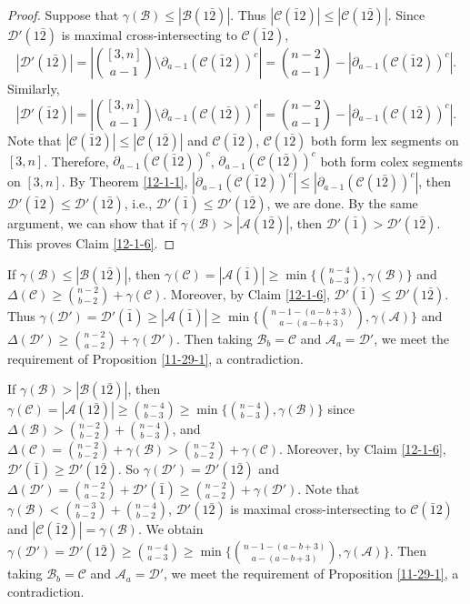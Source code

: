 \documentclass[11pt]{article}
\begin{document}
\begin{proof}
Suppose that $\gamma(\mathcal{B})\le |\mathcal{B}(1\bar{2})|$. Thus $|\mathcal{C}(\bar{1}2)|\le |\mathcal{C}(1\bar{2})|$. Since $\mathcal{D}'(1\bar{2})$ is maximal cross-intersecting to $\mathcal{C}(\bar{1}2)$, 
$$|\mathcal{D}'(1\bar{2})|=|{[3,n]\choose a-1}\setminus \partial_{a-1}(\mathcal{C}(\bar{1}2))^c|={n-2\choose a-1}-|\partial_{a-1}(\mathcal{C}(\bar{1}2))^c|.$$ 
Similarly, 
$$|\mathcal{D}'(\bar{1}2)|=|{[3,n]\choose a-1}\setminus \partial_{a-1}(\mathcal{C}(1\bar{2}))^c|={n-2\choose a-1}-|\partial_{a-1}(\mathcal{C}(1\bar{2}))^c|.$$ 
Note that $|\mathcal{C}(\bar{1}2)|\le |\mathcal{C}(1\bar{2})|$ and $\mathcal{C}(\bar{1}2)$, $\mathcal{C}(1\bar{2})$ both form lex segments on $[3,n]$. Therefore, $\partial_{a-1}(\mathcal{C}(\bar{1}2))^c$, $\partial_{a-1}(\mathcal{C}(1\bar{2}))^c$ both form colex segments on $[3,n]$. By Theorem \ref{12-1-1}, 
$|\partial_{a-1}(\mathcal{C}(\bar{1}2))^c| \le |\partial_{a-1}(\mathcal{C}(1\bar{2}))^c|$, 
 then $\mathcal{D}'(\bar{1}2)\le \mathcal{D}'(1\bar{2})$, i.e., $\mathcal{D}'(\bar{1})\le \mathcal{D}'(1\bar{2})$, we are done. 
By the same argument, we can show that if  $\gamma(\mathcal{B})> |\mathcal{A}(1\bar{2})|$, then $\mathcal{D}'(\bar{1})> \mathcal{D}'(1\bar{2})$. This proves Claim \ref{12-1-6}.
\end{proof}

If $\gamma(\mathcal{B})\le |\mathcal{B}(1\bar{2})|$, then 
 $\gamma(\mathcal{C})=|\mathcal{A}(\bar{1})|\ge \min \{{n-4\choose b-3}, \gamma(\mathcal{B})\}$ and $\Delta(\mathcal{C})\ge {n-2\choose b-2}+\gamma(\mathcal{C})$.  Moreover,  by Claim \ref{12-1-6}, 
$\mathcal{D}'(\bar{1})\le \mathcal{D}'(1\bar{2})$.  Thus 
$\gamma(\mathcal{D}')=\mathcal{D}'(\bar{1})\ge |\mathcal{A}(\bar{1})|\ge \min \{ {n-1-(a-b+3)\choose a-(a-b+3)}, \gamma(\mathcal{A})   \}$ and $\Delta(\mathcal{D}')\ge {n-2\choose a-2}+\gamma(\mathcal{D}')$. Then taking $\mathcal{B}_b=\mathcal{C}$ and $\mathcal{A}_a=\mathcal{D}'$, we meet the requirement of Proposition \ref{11-29-1}, a contradiction.


If $\gamma(\mathcal{B})> |\mathcal{B}(1\bar{2})|$, then 
 $\gamma(\mathcal{C})=|\mathcal{A}(1\bar{2})|\ge {n-4\choose b-3} \ge \min \{{n-4\choose b-3}, \gamma(\mathcal{B})\}$ since $\Delta(\mathcal{B})> {n-2\choose b-2}+{n-4\choose b-3}$,  and $\Delta(\mathcal{C})={n-2\choose b-2}+\gamma(\mathcal{B})> {n-2\choose b-2}+\gamma(\mathcal{C})$.  Moreover,  by Claim \ref{12-1-6}, 
$\mathcal{D}'(\bar{1})\ge  \mathcal{D}'(1\bar{2})$. 
So $\gamma(\mathcal{D}')=\mathcal{D}'(1\bar{2})$ and 
 $\Delta(\mathcal{D}')={n-2\choose a-2}+\mathcal{D}'(\bar{1}) \ge {n-2\choose a-2}+\gamma(\mathcal{D}')$.
  Note that $\gamma(\mathcal{B})< {n-3\choose b-2}+{n-4\choose b-2}$, $\mathcal{D}'(1\bar{2})$ is maximal cross-intersecting to $\mathcal{C}(\bar{1}2)$ and $|\mathcal{C}(\bar{1}2)|=\gamma(\mathcal{B})$. We obtain $\gamma(\mathcal{D}')=\mathcal{D}'(1\bar{2})\ge {n-4\choose a-3}\ge \min \{{n-1-(a-b+3)\choose a-(a-b+3)}, \gamma(\mathcal{A})\}$. 
 Then taking $\mathcal{B}_b=\mathcal{C}$ and $\mathcal{A}_a=\mathcal{D}'$, we meet the requirement of Proposition \ref{11-29-1}, a contradiction.
 
\end{document}
